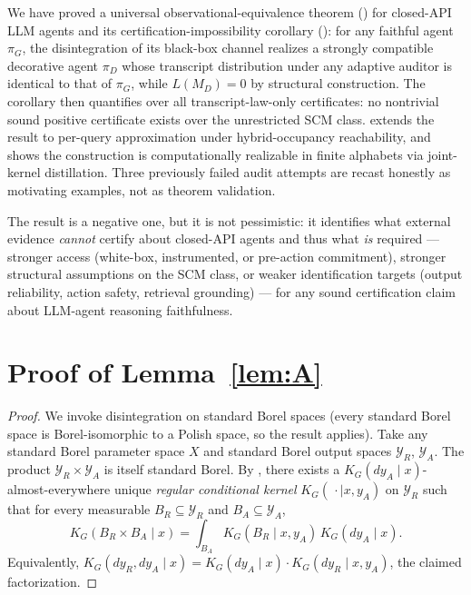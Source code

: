 \documentclass{article}
\theoremstyle{plain}
\theoremstyle{definition}
\theoremstyle{remark}
\newcommand{\YR}{\mathcal{Y}_R}
\newcommand{\YA}{\mathcal{Y}_A}
\begin{document}
We have proved a universal observational-equivalence theorem
() for closed-API LLM agents and its
certification-impossibility corollary (): for any faithful
agent $\pi_G$, the disintegration of its black-box channel realizes a
strongly compatible decorative agent $\pi_D$ whose transcript distribution
under any adaptive auditor is identical to that of $\pi_G$, while
$L(M_D) = 0$ by structural construction. The corollary then quantifies over
all transcript-law-only certificates: no nontrivial sound positive certificate
exists over the unrestricted SCM class.  extends the result
to per-query approximation under hybrid-occupancy reachability, and
 shows the construction is computationally
realizable in finite alphabets via joint-kernel distillation. Three previously
failed audit attempts are recast honestly as motivating examples, not as
theorem validation.

The result is a negative one, but it is not pessimistic: it identifies what
external evidence \emph{cannot} certify about closed-API agents and thus what
\emph{is} required --- stronger access (white-box, instrumented, or pre-action
commitment), stronger structural assumptions on the SCM class, or weaker
identification targets (output reliability, action safety, retrieval grounding)
--- for any sound certification claim about LLM-agent reasoning faithfulness.




\appendix

\section{Proof of Lemma~\ref{lem:A}}\label{app:lem-A-proof}

\begin{proof}
We invoke disintegration on standard Borel spaces (every standard Borel
space is Borel-isomorphic to a Polish space, so the result applies). Take any
standard Borel parameter space $X$ and standard Borel output spaces $\YR$, $\YA$.
The product $\YR \times \YA$ is itself standard Borel. By \citet[Theorem~8.5]{kallenberg2021}, there exists a
$K_G(dy_A \mid x)$-almost-everywhere unique \emph{regular conditional kernel}
$K_G(\,\cdot \mid x, y_A)$ on $\YR$ such that for every measurable
$B_R \subseteq \YR$ and $B_A \subseteq \YA$,
\[
K_G(B_R \times B_A \mid x)
=
\int_{B_A} K_G(B_R \mid x, y_A)\, K_G(dy_A \mid x).
\]
Equivalently, $K_G(dy_R, dy_A \mid x) = K_G(dy_A \mid x) \cdot K_G(dy_R \mid x, y_A)$,
the claimed factorization.
\end{proof}
\end{document}
